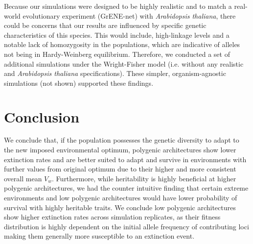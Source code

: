 \documentclass{article}
\begin{document}
Because our simulations were designed to be highly realistic and to match a real-world evolutionary experiment (GrENE-net) with \textit{Arabidopsis thaliana}, there could be concerns that our results are influenced by specific genetic characteristics of this species. This would include, high-linkage levels and a notable lack of homozygosity in the populations, which are indicative of alleles not being in Hardy-Weinberg equilibrium. Therefore, we conducted a set of additional simulations under the Wright-Fisher model (i.e. without any realistic and \textit{Arabidopsis thaliana} specifications). These simpler, organism-agnostic simulations (not shown) supported these findings. 

\section{Conclusion}
We conclude that, if the population possesses the genetic diversity to adapt to the new imposed environmental optimum, polygenic architectures show lower extinction rates and are better suited to adapt and survive in environments with further values from original optimum due to their higher and more consistent overall mean $V_w$. Furthermore, while heritability is highly beneficial at higher polygenic architectures, we had the counter intuitive finding that certain extreme environments and low polygenic architectures would have lower probability of survival with highly heritable traits. We conclude low polygenic architectures show higher extinction rates across simulation replicates, as their fitness distribution is highly dependent on the initial allele frequency of contributing loci making them generally more susceptible to an extinction event. 


\end{document}
